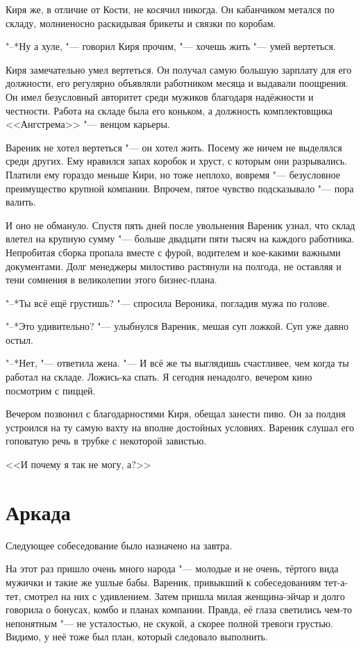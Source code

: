 Киря же, в отличие от Кости, не косячил никогда.
Он кабанчиком метался по складу, молниеносно раскидывая брикеты и связки по коробам.

"--*Ну а хуле, "--- говорил Киря прочим, "--- хочешь жить "--- умей вертеться.

Киря замечательно умел вертеться.
Он получал самую большую зарплату для его должности, его регулярно объявляли работником месяца и выдавали поощрения.
Он имел безусловный авторитет среди мужиков благодаря надёжности и честности.
Работа на складе была его коньком, а должность комплектовщика <<Ангстрема>> "--- венцом карьеры.

Вареник не хотел вертеться "--- он хотел жить.
Посему же ничем не выделялся среди других.
Ему нравился запах коробок и хруст, с которым они разрывались.
Платили ему гораздо меньше Кири, но тоже неплохо, вовремя "--- безусловное преимущество крупной компании.
Впрочем, пятое чувство подсказывало "--- пора валить.

И оно не обмануло.
Спустя пять дней после увольнения Вареник узнал, что склад влетел на крупную сумму "--- больше двадцати пяти тысяч на каждого работника.
Непробитая сборка пропала вместе с фурой, водителем и кое-какими важными документами.
Долг менеджеры милостиво растянули на полгода, не оставляя и тени сомнения в великолепии этого бизнес-плана.

"--*Ты всё ещё грустишь? "--- спросила Вероника, погладив мужа по голове.

"--*Это удивительно? "--- улыбнулся Вареник, мешая суп ложкой.
Суп уже давно остыл.

"--*Нет, "--- ответила жена.
"--- И всё же ты выглядишь счастливее, чем когда ты работал на складе.
Ложись-ка спать.
Я сегодня ненадолго, вечером кино посмотрим с пиццей.

Вечером позвонил с благодарностями Киря, обещал занести пиво.
Он за полдня устроился на ту самую вахту на вполне достойных условиях.
Вареник слушал его гоповатую речь в трубке с некоторой завистью.

<<И почему я так не могу, а?>>

\section{Аркада}

Следующее собеседование было назначено на завтра.

На этот раз пришло очень много народа "--- молодые и не очень, тёртого вида мужички и такие же ушлые бабы.
Вареник, привыкший к собеседованиям тет-а-тет, смотрел на них с удивлением.
Затем пришла милая женщина-эйчар и долго говорила о бонусах, комбо и планах компании.
Правда, её глаза светились чем-то непонятным "--- не усталостью, не скукой, а скорее полной тревоги грустью.
Видимо, у неё тоже был план, который следовало выполнить.

